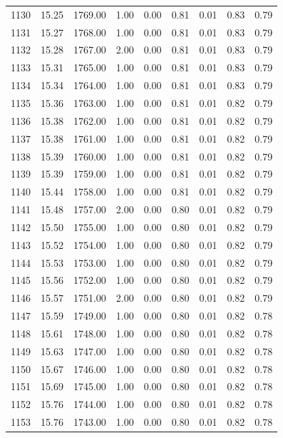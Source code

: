 \documentclass{article}\usepackage[]{graphicx}\usepackage[]{color}
\begin{document}
\begin{longtable}{rrrrrrrrr}
  1130 & 15.25 & 1769.00 & 1.00 & 0.00 & 0.81 & 0.01 & 0.83 & 0.79 \\ 
  1131 & 15.27 & 1768.00 & 1.00 & 0.00 & 0.81 & 0.01 & 0.83 & 0.79 \\ 
  1132 & 15.28 & 1767.00 & 2.00 & 0.00 & 0.81 & 0.01 & 0.83 & 0.79 \\ 
  1133 & 15.31 & 1765.00 & 1.00 & 0.00 & 0.81 & 0.01 & 0.83 & 0.79 \\ 
  1134 & 15.34 & 1764.00 & 1.00 & 0.00 & 0.81 & 0.01 & 0.83 & 0.79 \\ 
  1135 & 15.36 & 1763.00 & 1.00 & 0.00 & 0.81 & 0.01 & 0.82 & 0.79 \\ 
  1136 & 15.38 & 1762.00 & 1.00 & 0.00 & 0.81 & 0.01 & 0.82 & 0.79 \\ 
  1137 & 15.38 & 1761.00 & 1.00 & 0.00 & 0.81 & 0.01 & 0.82 & 0.79 \\ 
  1138 & 15.39 & 1760.00 & 1.00 & 0.00 & 0.81 & 0.01 & 0.82 & 0.79 \\ 
  1139 & 15.39 & 1759.00 & 1.00 & 0.00 & 0.81 & 0.01 & 0.82 & 0.79 \\ 
  1140 & 15.44 & 1758.00 & 1.00 & 0.00 & 0.81 & 0.01 & 0.82 & 0.79 \\ 
  1141 & 15.48 & 1757.00 & 2.00 & 0.00 & 0.80 & 0.01 & 0.82 & 0.79 \\ 
  1142 & 15.50 & 1755.00 & 1.00 & 0.00 & 0.80 & 0.01 & 0.82 & 0.79 \\ 
  1143 & 15.52 & 1754.00 & 1.00 & 0.00 & 0.80 & 0.01 & 0.82 & 0.79 \\ 
  1144 & 15.53 & 1753.00 & 1.00 & 0.00 & 0.80 & 0.01 & 0.82 & 0.79 \\ 
  1145 & 15.56 & 1752.00 & 1.00 & 0.00 & 0.80 & 0.01 & 0.82 & 0.79 \\ 
  1146 & 15.57 & 1751.00 & 2.00 & 0.00 & 0.80 & 0.01 & 0.82 & 0.79 \\ 
  1147 & 15.59 & 1749.00 & 1.00 & 0.00 & 0.80 & 0.01 & 0.82 & 0.78 \\ 
  1148 & 15.61 & 1748.00 & 1.00 & 0.00 & 0.80 & 0.01 & 0.82 & 0.78 \\ 
  1149 & 15.63 & 1747.00 & 1.00 & 0.00 & 0.80 & 0.01 & 0.82 & 0.78 \\ 
  1150 & 15.67 & 1746.00 & 1.00 & 0.00 & 0.80 & 0.01 & 0.82 & 0.78 \\ 
  1151 & 15.69 & 1745.00 & 1.00 & 0.00 & 0.80 & 0.01 & 0.82 & 0.78 \\ 
  1152 & 15.76 & 1744.00 & 1.00 & 0.00 & 0.80 & 0.01 & 0.82 & 0.78 \\ 
  1153 & 15.76 & 1743.00 & 1.00 & 0.00 & 0.80 & 0.01 & 0.82 & 0.78 \\ 

\end{longtable}
\end{document}
